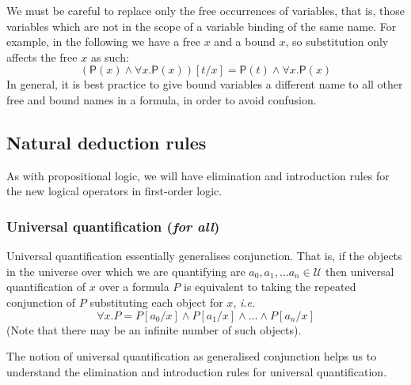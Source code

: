 \documentclass{article}
\theoremstyle{definition}
\newcommand{\rel}[1]{\mathsf{#1}}
\newcommand{\ie}{\emph{i.e.}}
\begin{document}
We must be careful to replace only the free
occurrences of variables, that is, those variables which are not in
the scope of a variable binding of the same name. For example, in the
following we have a free $x$ and a bound $x$, so substitution only
affects the free $x$ as such:
%
\begin{equation*}
(\rel{P}(x) \wedge \forall x . \rel{P}(x))[t/x] 
= \rel{P}(t) \wedge \forall x . \rel{P}(x)
\end{equation*}
%
In general, it is best practice to give bound variables a different name
to all other free and bound names in a formula, in order to avoid confusion.

\subsection{Natural deduction rules}

As with propositional logic, we will have elimination and introduction
rules for the new logical operators in first-order logic.

\subsubsection{Universal quantification (\emph{for all})}

Universal quantification essentially generalises conjunction.  That
is, if the objects in the universe over which we are quantifying are
$a_0, a_1, \ldots a_n \in \mathcal{U}$ then universal quantification
of $x$ over a formula $P$ is equivalent to taking the repeated
conjunction of $P$ substituting each object for $x$, \ie{}
%
\begin{equation}
\forall x . P = P[a_0/x] \wedge P[a_1/x] \wedge
\ldots \wedge P[a_{n}/x]
\label{eq:forall-meaning}
\end{equation}
%
(Note that there may be an infinite number of such objects).

The notion of universal quantification as generalised conjunction
helps us to understand the elimination and introduction rules for universal
quantification.
\end{document}
